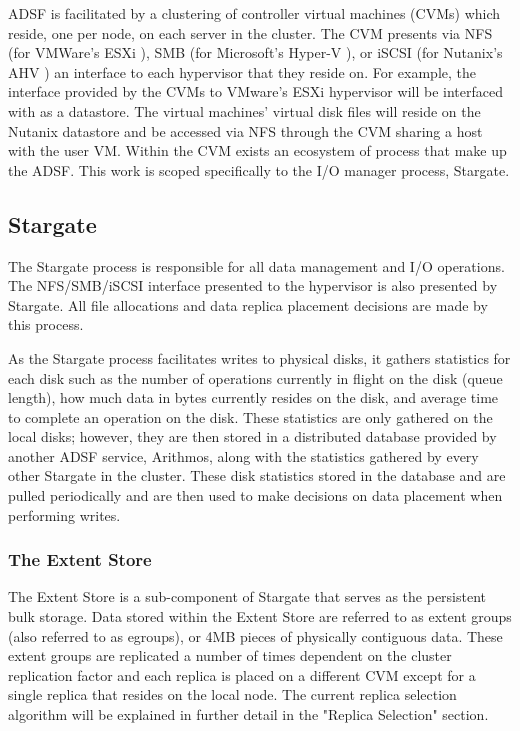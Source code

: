 \documentclass[12pt]{article}
\begin{document}
  ADSF is facilitated by a clustering of controller virtual machines (CVMs)
  which reside, one per node, on each server in the cluster. The CVM presents
  via NFS (for VMWare's ESXi \cite{esxi2008}), SMB (for Microsoft's Hyper-V
  \cite{hyperv2009}), or
  iSCSI (for Nutanix's AHV \cite{bible}) an interface to each hypervisor that they
  reside on. For example, the interface provided by the CVMs to VMware's ESXi
  hypervisor will be interfaced with as a datastore. The virtual machines'
  virtual disk files will reside on the Nutanix datastore and be accessed via
  NFS through the CVM sharing a host with the user VM. Within the CVM exists an
  ecosystem of process that make up the ADSF. This work is scoped specifically
  to the I/O manager process, Stargate.


  \subsection{Stargate}

  The Stargate process is responsible for all data management and I/O
  operations. The NFS/SMB/iSCSI interface presented to the hypervisor is also
  presented by Stargate. All file allocations and data replica placement
  decisions are made by this process.

  As the Stargate process facilitates writes to physical disks, it gathers
  statistics for each disk such as the number of operations currently in flight
  on the disk (queue length), how much data in bytes currently resides on the
  disk, and average time to complete an operation on the disk. These statistics
  are only gathered on the local disks; however, they are then stored in a
  distributed database provided by another ADSF service, Arithmos, along with
  the statistics gathered by every other Stargate in the cluster. These disk
  statistics stored in the database and are pulled periodically and are then
  used to make decisions on data placement when performing writes.

    \subsubsection{The Extent Store}

    The Extent Store is a sub-component of Stargate that serves as the
    persistent bulk storage. Data stored within the Extent Store are referred
    to as extent groups (also referred to as egroups), or 4MB pieces of
    physically contiguous data. These extent groups are replicated a number of
    times dependent on the cluster replication factor and each replica is
    placed on a different CVM except for a single replica that resides on the
    local node. The current replica selection algorithm will be explained in
    further detail in the "Replica Selection" section.
\end{document}

